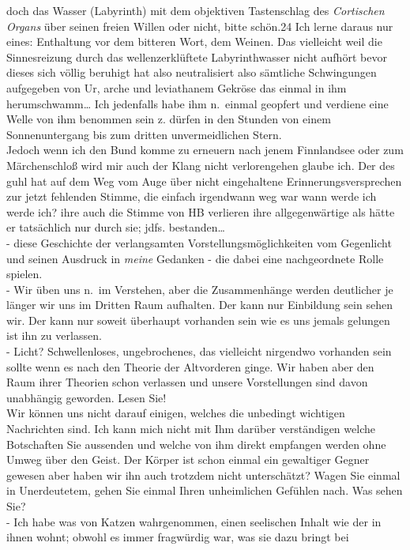 \documentclass[
]{article}
\begin{document}
doch das Wasser (Labyrinth) mit dem objektiven Tastenschlag des
\emph{Cortischen Organs} über seinen freien Willen oder nicht, bitte
schön.24 Ich lerne daraus nur eines: Enthaltung vor dem bitteren Wort,
dem Weinen. Das vielleicht weil die Sinnesreizung durch das
wellenzerklüftete Labyrinthwasser nicht aufhört bevor dieses sich völlig
beruhigt hat also neutralisiert also sämtliche Schwingungen aufgegeben
von Ur, arche und leviathanem Gekröse das einmal in ihm
herumschwamm\ldots{} Ich jedenfalls habe ihm n.~einmal geopfert und
verdiene eine Welle von ihm benommen sein z. dürfen in den Stunden von
einem Sonnenuntergang bis zum dritten unvermeidlichen Stern.\\
Jedoch wenn ich den Bund komme zu erneuern nach jenem Finnlandsee oder
zum Märchenschloß wird mir auch der Klang nicht verlorengehen glaube
ich. Der des guhl hat auf dem Weg vom Auge über nicht eingehaltene
Erinnerungsversprechen zur jetzt fehlenden Stimme, die einfach
irgendwann weg war wann werde ich werde ich? ihre auch die Stimme von HB
verlieren ihre allgegenwärtige als hätte er tatsächlich nur durch sie;
jdfs. bestanden\ldots{}\\
- diese Geschichte der verlangsamten Vorstellungsmöglichkeiten vom
Gegenlicht und seinen Ausdruck in \emph{meine} Gedanken - die dabei eine
nachgeordnete Rolle spielen.\\
- Wir üben uns n.~im Verstehen, aber die Zusammenhänge werden deutlicher
je länger wir uns im Dritten Raum aufhalten. Der kann nur Einbildung
sein sehen wir. Der kann nur soweit überhaupt vorhanden sein wie es uns
jemals gelungen ist ihn zu verlassen.\\
- Licht? Schwellenloses, ungebrochenes, das vielleicht nirgendwo
vorhanden sein sollte wenn es nach den Theorie der Altvorderen ginge.
Wir haben aber den Raum ihrer Theorien schon verlassen und unsere
Vorstellungen sind davon unabhängig geworden. Lesen Sie!\\
Wir können uns nicht darauf einigen, welches die unbedingt wichtigen
Nachrichten sind. Ich kann mich nicht mit Ihm darüber verständigen
welche Botschaften Sie aussenden und welche von ihm direkt empfangen
werden ohne Umweg über den Geist. Der Körper ist schon einmal ein
gewaltiger Gegner gewesen aber haben wir ihn auch trotzdem nicht
unterschätzt? Wagen Sie einmal in Unerdeutetem, gehen Sie einmal Ihren
unheimlichen Gefühlen nach. Was sehen Sie?\\
- Ich habe was von Katzen wahrgenommen, einen seelischen Inhalt wie der
in ihnen wohnt; obwohl es immer fragwürdig war, was sie dazu bringt bei
\end{document}
